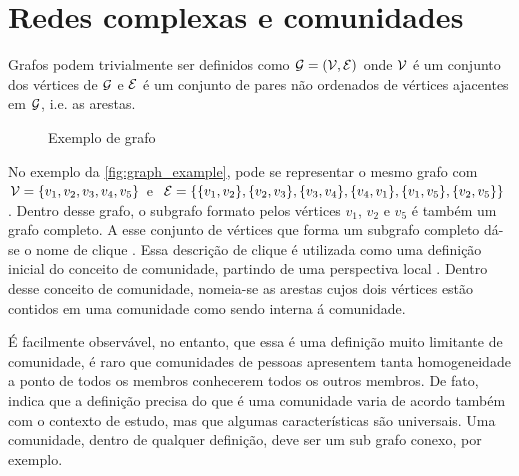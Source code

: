 \documentclass[notes.tex]{subfiles}
\begin{document}
\section{Redes complexas e comunidades}

Grafos podem trivialmente ser definidos como $\operatorname{\mathcal{G}} = (\operatorname{\mathcal{V}}, \operatorname{\mathcal{E}})$ onde $\operatorname{\mathcal{V}}$ é um conjunto dos vértices de  $\operatorname{\mathcal{G}}$ e  $\operatorname{\mathcal{E}}$ é um conjunto de pares não ordenados de vértices ajacentes em $\operatorname{\mathcal{G}}$, i.e. as arestas.

\begin{figure}[htpb]
    \centering
    \caption{Exemplo de grafo}\label{fig:graph_example}
\end{figure}
\medskip

No exemplo da \autoref{fig:graph_example}, pode se representar o mesmo grafo com $\operatorname{\mathcal{V}} = \{v_1, v_2, v_3, v_4, v_5\}$ e $\operatorname{\mathcal{E}} = \{\{v_1, v_2\}, \{v_2, v_3\}, \{v_3, v_4\}, \{v_4, v_1\}, \{v_1, v_5\}, \{v_2, v_5\}\}$.
Dentro desse grafo, o subgrafo formato pelos vértices $v_1$, $v_2$ e $v_5$ é também um grafo completo.
A esse conjunto de vértices que forma um subgrafo completo dá-se o nome de clique \cite{fortunato2010community}.
Essa descrição de clique é utilizada como uma definição inicial do conceito de comunidade, partindo de uma perspectiva local \cite{fortunato2010community}.
Dentro desse conceito de comunidade, nomeia-se as arestas cujos dois vértices estão contidos em uma comunidade como sendo interna á comunidade.

É facilmente observável, no entanto, que essa é uma definição muito limitante de comunidade, é raro que comunidades de pessoas apresentem tanta homogeneidade a ponto de todos os membros conhecerem todos os outros membros.
De fato,  indica que a definição precisa do que é uma comunidade varia de acordo também com o contexto de estudo, mas que algumas características são universais.
Uma comunidade, dentro de qualquer definição, deve ser um sub grafo conexo, por exemplo.
\end{document}
